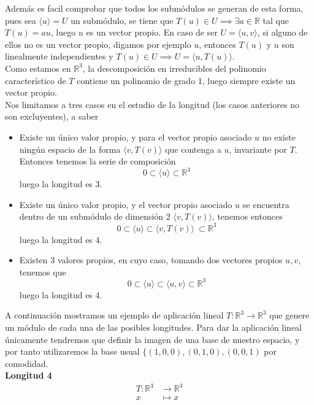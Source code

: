 Además es facil comprobar que todos los submódulos se generan de
esta forma, pues sea \(\langle u \rangle = U\) un submódulo, se tiene que \(T(u)
\in U \implies \exists a \in \mathbb{R}\) tal que \(T(u) = au\), luego \(u\) es un
vector propio. En caso de ser \(U = \langle u , v \rangle\), si alguno de ellos
no es un vector propio, digamos por ejemplo \(u\), entonces \(T(u)\) y \(u\) son linealmente independientes y
\(T(u) \in U \implies U = \langle u , T(u) \rangle\).\\

Como estamos en \(\mathbb{R}^3\), la descomposición en irreducibles del
polinomio característico de \(T\) contiene un polinomio de grado 1, luego
siempre existe un vector propio.\\

Nos limitamos a tres casos en el estudio de la longitud (los casos
anteriores no son excluyentes), a saber
\begin{itemize}
\item Existe un único valor propio, y para el vector propio asociado \(u\)  no existe ningún espacio de la forma
  \(\langle v, T(v)\rangle \) que contenga a \(u\), invariante por \(T\). Entonces tenemos la serie de composición
  \[
    0 \subset \langle u \rangle \subset \mathbb{R}^3
  \]
  luego la longitud es 3.
\item Existe un único valor propio, y el vector propio asociado \(u\) se encuentra dentro de un submódulo de
  dimensión 2 \(\langle v, T(v) \rangle\), tenemos entonces
  \[
    0 \subset \langle u \rangle \subset \langle v, T(v) \rangle\ \subset \mathbb{R}^3
  \]
  luego la longitud es 4.
\item Existen 3 valores propios, en cuyo caso, tomando dos vectores propios \(u,v\), tenemos que
\[
0 \subset \langle u \rangle \subset \langle u, v \rangle \subset \mathbb{R}^3
\]
luego la longitud es 4.
\end{itemize}

A continuación mostramos un ejemplo de aplicación lineal \(T:\mathbb{R}^3 \rightarrow \mathbb{R}^3\) que genere un módulo de cada una de las posibles longitudes.
Para dar la aplicación lineal únicamente tendremos que definir la imagen de una base de nuestro espacio, y por tanto utilizaremos la base usual
\(\{(1,0,0), (0,1,0), (0,0,1)\) por comodidad.\\

\textbf{Longitud 4}%
\[
\begin{aligned}
  T:\mathbb{R}^3 &\rightarrow \mathbb{R}^3\\
  x &\mapsto x
\end{aligned}
\]

